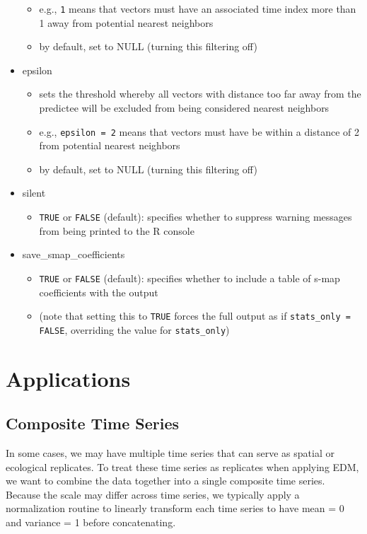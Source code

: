 \begin{itemize}
\begin{itemize}
	\item e.g., \lstinline{1} means that vectors must have an associated time index more than 1 away from potential nearest neighbors
	\item by default, set to NULL (turning this filtering off)
	\end{itemize}
\item epsilon
	\begin{itemize}
	\item sets the threshold whereby all vectors with distance too far away from the predictee will be excluded from being considered nearest neighbors
	\item e.g., \lstinline{epsilon = 2} means that vectors must have be within a distance of 2 from potential nearest neighbors
	\item by default, set to NULL (turning this filtering off)
	\end{itemize}
\item silent
	\begin{itemize}
	\item \lstinline{TRUE} or \lstinline{FALSE} (default): specifies whether to suppress warning messages from being printed to the R console
	\end{itemize}
\item save\_smap\_coefficients
	\begin{itemize}
	\item \lstinline{TRUE} or \lstinline{FALSE} (default): specifies whether to include a table of s-map coefficients with the output
	\item (note that setting this to \lstinline{TRUE} forces the full output as if \lstinline{stats_only = FALSE}, overriding the value for \lstinline{stats_only})
	\end{itemize}
\end{itemize}

\section{Applications}

\subsection{Composite Time Series}

In some cases, we may have multiple time series that can serve as spatial or ecological replicates. To treat these time series as replicates when applying EDM, we want to combine the data together into a single composite time series. Because the scale may differ across time series, we typically apply a normalization routine to linearly transform each time series to have mean = 0 and variance = 1 before concatenating. 

